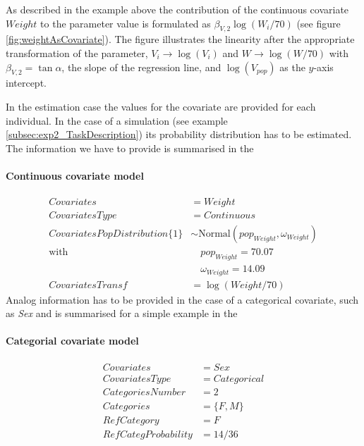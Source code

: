 As described in the example above the contribution of the continuous
covariate $Weight$ to the parameter value is formulated as
$\beta_{V,2} \log(W_i/70)$ (see figure
\ref{fig:weightAsCovariate}). The figure illustrates the linearity
after the appropriate transformation of the parameter, $V_i
\longrightarrow \log(V_i)$ and $W \longrightarrow \log(W/70)$ with
$\beta_{V,2} = \tan{\alpha}$, the slope of the regression line, and
$\log(V_{pop})$ as the $y$-axis intercept.

In the estimation case the values for the covariate are provided for
each individual. In the case of a simulation (see example
\ref{subsec:exp2_TaskDescription}) its probability distribution has to
be estimated. The information we have to provide is summarised in the

\paragraph{Continuous covariate model}
\begin{align*}
Covariates & =  Weight  \\
CovariatesType & = Continuous  \\
CovariatesPopDistribution\{1\} & \sim \mbox{Normal}(pop_{Weight}, \omega_{Weight})  \\
 \text{with} & \quad pop_{Weight}=70.07 \\
 & \quad \omega_{Weight}=14.09  \\
CovariatesTransf & =\log(Weight/70) 
\end{align*}
Analog information has to be provided in the case of a categorical covariate, such as \textit{Sex} and is summarised for a simple example in the

\paragraph{Categorial covariate model}
\begin{align*}
Covariates &= Sex   \\
CovariatesType &= Categorical  \\
CategoriesNumber &= 2   \\
Categories &= \{F,M\}   \\
RefCategory &= F   \\
RefCategProbability &= 14/36 
\end{align*}


